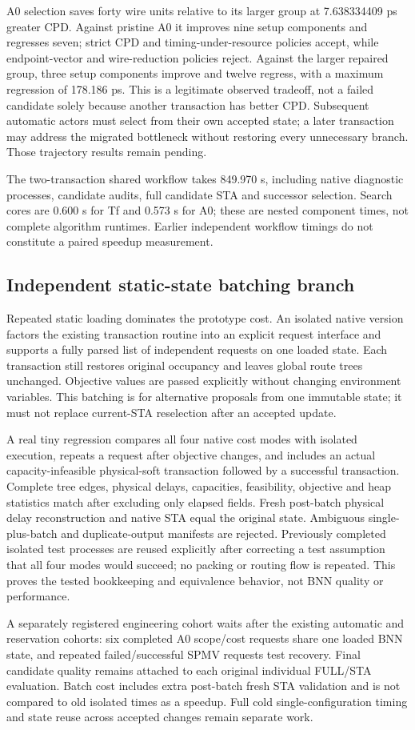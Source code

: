 A0 selection saves forty wire units relative to its larger group at 7.638334409 ps greater CPD. Against pristine A0 it improves nine setup components and regresses seven; strict CPD and timing-under-resource policies accept, while endpoint-vector and wire-reduction policies reject. Against the larger repaired group, three setup components improve and twelve regress, with a maximum regression of 178.186 ps. This is a legitimate observed tradeoff, not a failed candidate solely because another transaction has better CPD. Subsequent automatic actors must select from their own accepted state; a later transaction may address the migrated bottleneck without restoring every unnecessary branch. Those trajectory results remain pending.

The two-transaction shared workflow takes 849.970 s, including native diagnostic processes, candidate audits, full candidate STA and successor selection. Search cores are 0.600 s for Tf and 0.573 s for A0; these are nested component times, not complete algorithm runtimes. Earlier independent workflow timings do not constitute a paired speedup measurement.

\subsection{Independent static-state batching branch}
Repeated static loading dominates the prototype cost. An isolated native version factors the existing transaction routine into an explicit request interface and supports a fully parsed list of independent requests on one loaded state. Each transaction still restores original occupancy and leaves global route trees unchanged. Objective values are passed explicitly without changing environment variables. This batching is for alternative proposals from one immutable state; it must not replace current-STA reselection after an accepted update.

A real tiny regression compares all four native cost modes with isolated execution, repeats a request after objective changes, and includes an actual capacity-infeasible physical-soft transaction followed by a successful transaction. Complete tree edges, physical delays, capacities, feasibility, objective and heap statistics match after excluding only elapsed fields. Fresh post-batch physical delay reconstruction and native STA equal the original state. Ambiguous single-plus-batch and duplicate-output manifests are rejected. Previously completed isolated test processes are reused explicitly after correcting a test assumption that all four modes would succeed; no packing or routing flow is repeated. This proves the tested bookkeeping and equivalence behavior, not BNN quality or performance.

A separately registered engineering cohort waits after the existing automatic and reservation cohorts: six completed A0 scope/cost requests share one loaded BNN state, and repeated failed/successful SPMV requests test recovery. Final candidate quality remains attached to each original individual FULL/STA evaluation. Batch cost includes extra post-batch fresh STA validation and is not compared to old isolated times as a speedup. Full cold single-configuration timing and state reuse across accepted changes remain separate work.
